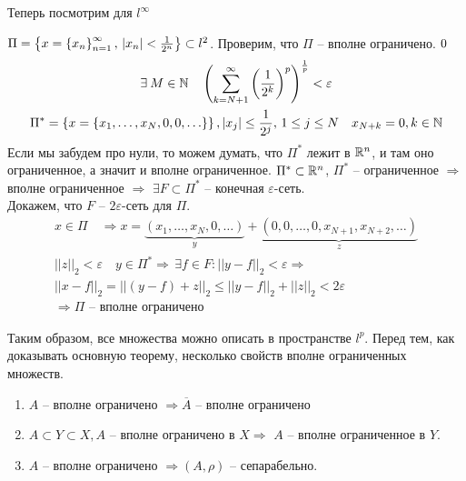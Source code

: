 \documentclass[document]{subfiles}
\begin{document}
Теперь посмотрим для $l^\infty$
\begin{example}
    $ \Pi = \left\{x = \left\{x_n\right\}^\infty_{n=1}, \, |x_n| < \frac{1}{2^n}\right\} \subset l^2$.
    Проверим, что $\Pi$ -- вполне ограничено.
    $\let \varepsilon > 0 $
    \begin{gather*}
        \exists M \in \bN \quad \left( \sum^\infty_{k=N+1} \left( \frac{1}{2^k} \right)^p \right)^{\frac{1}{p}} < \varepsilon \\
        \Pi^* = \seq{x = \seq{x_1, \ldots, x_N, 0, 0, \ldots}}, |x_j| \leq \frac{1}{2^j}, \, 1 \leq j \leq N \quad x_{N+k} =0, k \in \bN
    \end{gather*}
    Если мы забудем про нули, то можем думать, что $\Pi^*$ лежит в $\mathbb{R}^n$, и там оно ограниченное, а значит и вполне ограниченное.
    $\Pi^* \subset \mathbb{R}^n$, $\Pi^*$ -- ограниченное $\Rightarrow$ вполне ограниченное $\Rightarrow$ 
    $\exists F \subset \Pi^*$ -- конечная $\varepsilon$-сеть. \\
    Докажем, что $F$ -- $2\varepsilon$-сеть для $\Pi$.
    \begin{gather*}
        x \in \Pi \quad \Rightarrow x = \underbrace{(x_1, \ldots, x_N, 0, \ldots)}_y + \underbrace{(0, 0, \ldots, 0, x_{N+1}, x_{N+2}, \ldots)}_z \\
        ||z||_2 < \varepsilon \quad y \in \Pi^* \Rightarrow \, \exists f \in F : ||y - f||_2 < \varepsilon \Rightarrow \\
        ||x - f||_2 = ||(y-f)+z||_2 \leq ||y-f||_2 + ||z||_2 < 2 \varepsilon \\
        \Rightarrow \Pi \text{ -- вполне ограничено }
    \end{gather*}
\end{example}

Таким образом, все множества можно описать в пространстве $l^p$.
Перед тем, как доказывать основную теорему, несколько свойств вполне ограниченных множеств.

\begin{property}
    \begin{enumerate}
        \item $A$ -- вполне ограничено $\Rightarrow \overline{A}$ -- вполне ограничено 
        \item $A \subset Y \subset X, A$  -- вполне ограничено в $X \Rightarrow$  $A$ -- вполне ограниченное в $Y$.
        \item $A$ -- вполне ограничено $\Rightarrow (A, \rho)$ -- сепарабельно.
    \end{enumerate}
\end{property}
\end{document}
